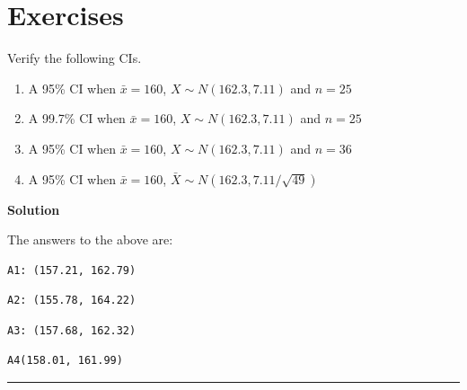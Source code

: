 \documentclass[
  letterpaper,
  DIV=11,
  numbers=noendperiod,
  oneside]{scrreprt}
\providecommand{\tightlist}{%
  \setlength{\itemsep}{0pt}\setlength{\parskip}{0pt}}\usepackage{longtable,booktabs,array}
\begin{document}
\hypertarget{exercises-3}{%
\section{Exercises}\label{exercises-3}}

Verify the following CIs.

\begin{enumerate}
\def\labelenumi{\arabic{enumi}.}
\tightlist
\item
  A 95\% CI when \(\bar x = 160\), \(X\sim N(162.3, 7.11)\) and \(n=25\)
\item
  A 99.7\% CI when \(\bar x = 160\), \(X\sim N(162.3, 7.11)\) and
  \(n=25\)
\item
  A 95\% CI when \(\bar x = 160\), \(X\sim N(162.3, 7.11)\) and
  \(n = 36\)
\item
  A 95\% CI when \(\bar x = 160\),
  \(\bar X\sim N(162.3, 7.11/\sqrt{49})\)
\end{enumerate}

\textbf{Solution}

The answers to the above are:

\begin{verbatim}
A1: (157.21, 162.79)
\end{verbatim}

\begin{verbatim}
A2: (155.78, 164.22)
\end{verbatim}

\begin{verbatim}
A3: (157.68, 162.32)
\end{verbatim}

\begin{verbatim}
A4(158.01, 161.99)
\end{verbatim}

\begin{center}\rule{0.5\linewidth}{0.5pt}\end{center}
\end{document}
